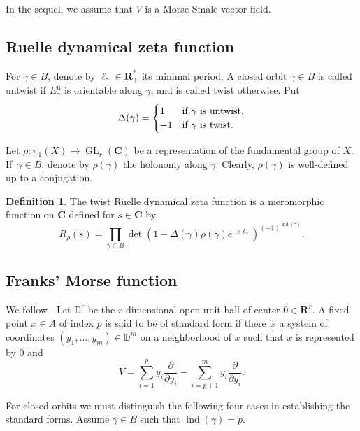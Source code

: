 \documentclass[11pt]{article}
\numberwithin{equation}{section}
\newcommand{\ru}{\mathrm{u}}
\theoremstyle{plain}
\theoremstyle{definition}
\newtheorem{defin}[lem]{Definition}
\theoremstyle{remark}
\newcommand{\bR}{\mathbf{R}}
\newcommand{\bC}{\mathbf{C}}
\newcommand{\bbD}{\mathbb{D}}
\DeclareMathOperator{\ind}{ind}
\DeclareMathOperator{\GL}{GL}
\let\p\partial
\begin{document}
In the sequel, we assume
that $V$ is a
Morse-Smale vector field.

\subsection{Ruelle dynamical zeta function}\label{sDZf}
For $\gamma\in B$, denote by $\ell_{\gamma}\in \bR^{*}_{+}$ its
minimal period. A closed orbit $\gamma\in B$
is called untwist if $E^{\ru}_{\gamma}$ is orientable along $\gamma$, and is
called twist otherwise. Put
\begin{equation}\label{Delta}
\Delta(\gamma)=
\begin{cases}
1&\hbox{if } \gamma \hbox{ is untwist},\\
-1&\hbox{if } \gamma \hbox{ is twist}.
\end{cases}
\end{equation}

Let $\rho:\pi_{1}(X)\to \GL_{r}(\bC)$ be a representation of the fundamental group of $X$. If~$\gamma\in B$, denote by $\rho(\gamma)$
the holonomy along $\gamma$. Clearly, $\rho(\gamma)$ is well-defined up to a conjugation.

\begin{defin} The twist Ruelle dynamical zeta function is a meromorphic
function on $\bC$ defined for $s\in \bC$ by
\begin{equation}\label{rrs}
R_{\rho}(s)=\prod_{\gamma\in
B}\det(1-\Delta(\gamma)\rho(\gamma)e^{-s
\ell_\gamma})^{(-1)^{\ind(\gamma)}}.
\end{equation}
\end{defin}

\subsection{Franks' Morse function}\label{sMSMF}
We follow \cite[\S 1]{Franks1979}. Let $\bbD^{r}$ be the
$r$-dimensional open unit ball of center $0\in
\bR^{r}$.
A fixed point $x\in A$ of index $p$ is said to be of standard form if there is a system of coordinates $(y_{1},\ldots, y_{m})\in \bbD^{m}$ on a neighborhood
of $x$ such that $x$ is represented by $0$ and
\begin{equation*}
V=\sum_{i=1}^{p}y_{i}\frac{\p}{\p
y_{i}}-\sum_{i=p+1}^{m}y_{i}\frac{\p}{\p y_{i}}.
\end{equation*}

For closed orbits we must distinguish the following four cases in
establishing the standard forms. Assume $\gamma\in B$ such that
$\ind(\gamma)=p$.
\end{document}
